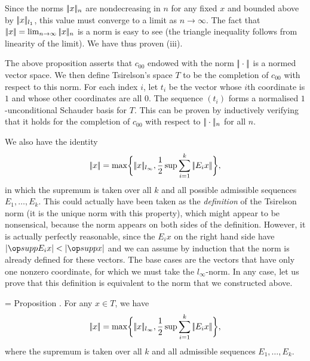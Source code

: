 Since the norms $|\!|x|\!|_n$ are nondecreasing in $n$ for any fixed $x$ and bounded above by $|\!|x|\!|_{l_1}$,
this value must converge to a limit as $n\to\infty$. The fact that $|\!|x|\!| = \lim_{n\to\infty} |\!|x|\!|_n$
is a norm is easy to see (the triangle inequality follows from linearity of the limit). We have thus proven
(iii).\slug

The above proposition asserts that $c_{00}$ endowed with the norm $|\!|\cdot|\!|$ is a normed vector space. We
then define Tsirelson's space $T$ to be the completion of $c_{00}$ with respect to this norm. For each index
$i$, let $t_i$ be the vector whose $i$th coordinate is $1$ and whose other coordinates are all $0$. The
sequence $(t_i)$ forms a normalised $1$-unconditional Schauder basis for $T$. This can be proven by inductively
verifying that it holds for the completion of $c_{00}$ with respect to $|\!|\cdot|\!| _n$ for all $n$.

We also have the identity
$$|\!|x|\!| = \max\biggl\{ |\!|x|\!|_{l_\infty}, {1\over 2}\sup \sum_{i=1}^k |\!|E_i x|\!|\biggr\},$$
in which the supremum is taken over all $k$ and all possible admissible sequences $E_1,\ldots,E_k$.
This could actually have been taken as the {\it definition} of the Tsirelson norm (it is the
unique norm with this property), which
might appear to be nonsensical, because the norm appears on both sides of the definition.
However, it is actually perfectly reasonable, since the $E_i x$ on the right hand side have
$|\supp E_i x| < |\supp x|$ and we can assume by induction that the norm is already defined for these vectors.
The base cases are the vectors that have only one nonzero coordinate, for which we must take the $l_\infty$-norm.
In any case, let us prove that this definition is equivalent to the norm that we constructed above.

\newcount\recursive
\recursive=\thmcount
\proclaim Proposition \advthm. For any $x\in T$, we have
$$|\!|x|\!| = \max\biggl\{ |\!|x|\!|_{l_\infty}, {1\over 2}\sup \sum_{i=1}^k |\!|E_i x|\!|\biggr\},$$
where the supremum is taken over all $k$ and all admissible sequences $E_1,\ldots,E_k$.

